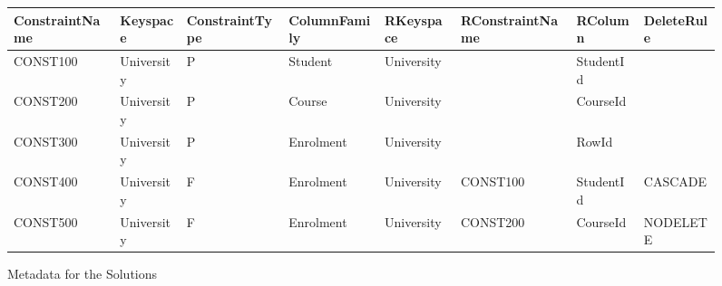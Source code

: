 
\begin{figure}[h]
	\centering
	\begin{tabular}{CCC CCC CC}
		\toprule
		\bfseries ConstraintName & \bfseries Keyspace & \bfseries ConstraintType &
		\bfseries ColumnFamily & \bfseries RKeyspace & \bfseries RConstraintName &
		\bfseries RColumn & \bfseries DeleteRule\\
		\midrule
		CONST100 & University & P & Student & University & & StudentId &\\
		\rc CONST200 & University & P & Course & University & & CourseId &\\
		CONST300 & University & P & Enrolment & University & & RowId &\\
		\rc CONST400 & University & F & Enrolment & University & CONST100 & StudentId
		& CASCADE\\
		CONST500 & University & F & Enrolment & University & CONST200 & CourseId &
		NODELETE\\
		\bottomrule
	\end{tabular}
	\caption{Metadata for the Solutions}\label{f:metadataInSolutions}
\end{figure}


